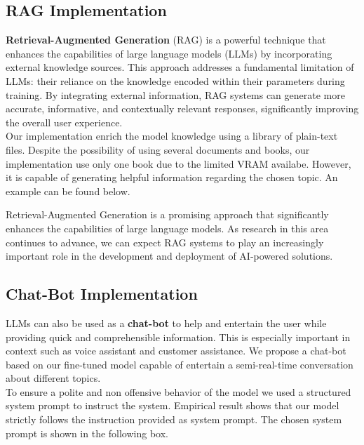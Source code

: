 \documentclass{article}
\begin{document}
	\subsection{RAG Implementation}
	\textbf{Retrieval-Augmented Generation} (RAG) is a powerful technique that enhances the capabilities of large language models (LLMs) by incorporating external knowledge sources. This approach addresses a fundamental limitation of LLMs: their reliance on the knowledge encoded within their parameters during training. By integrating external information, RAG systems can generate more accurate, informative, and contextually relevant responses, significantly improving the overall user experience. \\
	Our implementation enrich the model knowledge using a library of plain-text files. Despite the possibility of using several documents and books, our implementation use only one book due to the limited VRAM availabe. However, it is capable of generating helpful information regarding the chosen topic. An example can be found below.
	
	\begin{center}
	\end{center}
	
	Retrieval-Augmented Generation is a promising approach that significantly enhances the capabilities of large language models. As research in this area continues to advance, we can expect RAG systems to play an increasingly important role in the development and deployment of AI-powered solutions.
	
	\subsection{Chat-Bot Implementation}
	LLMs can also be used as a \textbf{chat-bot} to help and entertain the user while providing quick and comprehensible information. This is especially important in context such as voice assistant and customer assistance. We propose a chat-bot based on our fine-tuned model capable of entertain a semi-real-time conversation about different topics. \\
	To ensure a polite and non offensive behavior of the model we used a structured system prompt to instruct the system. Empirical result shows that our model strictly follows the instruction provided as system prompt. The chosen system prompt is shown in the following box.\\
	
\end{document}
